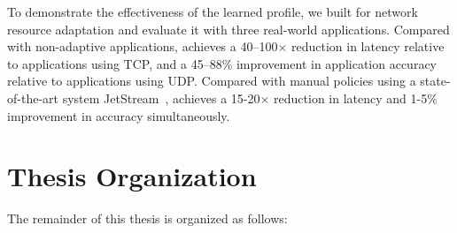 \documentclass[thesis.tex]{subfiles}
\begin{document}
To demonstrate the effectiveness of the learned profile, we built \awstream{}
for network resource adaptation and evaluate it with three real-world
applications. Compared with non-adaptive applications, \awstream{} achieves a
40--100$\times$ reduction in latency relative to applications using TCP, and a
45--88\% improvement in application accuracy relative to applications using
UDP. Compared with manual policies using a state-of-the-art system
JetStream~\cite{rabkin2014aggregation}, \awstream{} achieves a 15-20$\times$
reduction in latency and 1-5\% improvement in accuracy simultaneously.

\section{Thesis Organization}
\label{sec:thesis-organization}

The remainder of this thesis is organized as follows:
\end{document}
